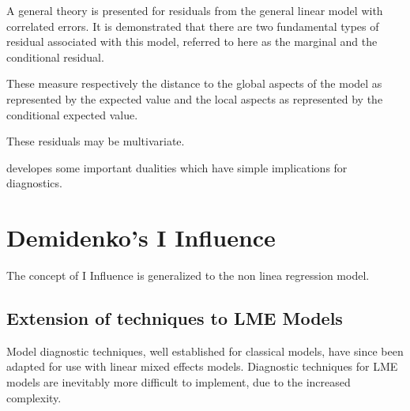 \documentclass[12pt, a4paper]{article}
\begin{document}
A general theory is presented for residuals from the general linear model with correlated errors.
It is demonstrated that there are two fundamental types of residual associated with this model,
referred to here as the marginal and the conditional residual.


These measure respectively the distance to the global aspects of the model as represented by the expected value
and the local aspects as represented by the conditional expected value.


These residuals may be multivariate.


\citet{HaslettHayes} developes some important dualities which have simple implications for diagnostics.





\section{Demidenko's I Influence} %
The concept of I Influence is generalized  to the non linea regression model.









\newpage
\subsection{Extension of techniques to LME Models} %

Model diagnostic techniques, well established for classical models, have since been adapted for use with linear mixed effects models. Diagnostic techniques for LME models are inevitably more difficult to implement, due to the increased complexity.
\end{document}
